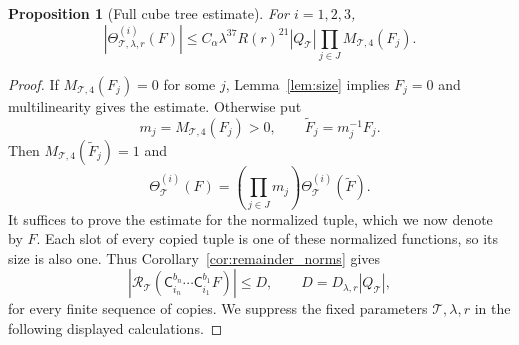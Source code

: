 \documentclass[12pt,reqno]{amsart}
\theoremstyle{plain}
\newtheorem{proposition}[theorem]{Proposition}
\theoremstyle{definition}
\theoremstyle{remark}
\numberwithin{equation}{section}
\newcommand{\T}{\mathcal T}
\begin{document}
\begin{proposition}[Full cube tree estimate]\label{prop:cube_tree}
For $i=1,2,3$,
\begin{equation}\label{eq:cube_tree}
 |\Theta^{(i)}_{\T,\lambda,r}(F)|\le
 C_\alpha\lambda^{37}R(r)^{21}|Q_\T|
                           \prod_{j\in J}M_{\T,4}(F_j).
\end{equation}
\end{proposition}
\begin{proof}
If $M_{\T,4}(F_j)=0$ for some $j$, Lemma~\ref{lem:size} implies
$F_j=0$ and multilinearity gives the estimate. Otherwise put
\[
 m_j=M_{\T,4}(F_j)>0,\qquad \widetilde F_j=m_j^{-1}F_j.
\]
Then $M_{\T,4}(\widetilde F_j)=1$ and
\[
 \Theta^{(i)}_\T(F)
     =\left(\prod_{j\in J}m_j\right)
                     \Theta^{(i)}_\T(\widetilde F).
\]
It suffices to prove the estimate for the normalized tuple, which we
now denote by $F$. Each slot of every copied tuple is one of these
normalized functions, so its size is also one. Thus
Corollary~\ref{cor:remainder_norms} gives
\[
 |\mathcal R_\T(\mathsf C_{i_n}^{b_n}\cdots
                     \mathsf C_{i_1}^{b_1}F)|\le D,
 \qquad D=D_{\lambda,r}|Q_\T|,
\]
for every finite sequence of copies. We suppress the fixed parameters
$\T,\lambda,r$ in the following displayed calculations.


\end{proof}
\end{document}
